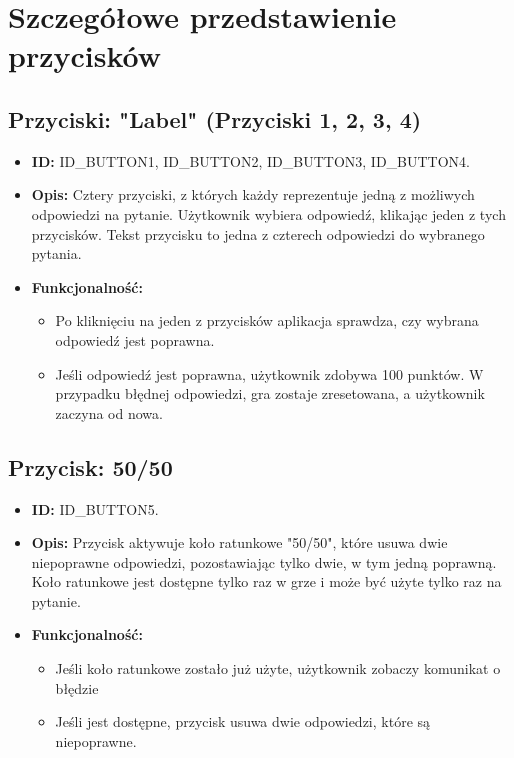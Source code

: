 \documentclass[]{article}
\begin{document}
	\section{Szczegółowe przedstawienie przycisków}
	
	\subsection{Przyciski: "Label" (Przyciski 1, 2, 3, 4)}
	\begin{itemize}
		\item \textbf{ID:} ID\_BUTTON1, ID\_BUTTON2, ID\_BUTTON3, ID\_BUTTON4.
		\item \textbf{Opis:} Cztery przyciski, z których każdy reprezentuje jedną z możliwych odpowiedzi na pytanie. Użytkownik wybiera odpowiedź, klikając jeden z tych przycisków. Tekst przycisku to jedna z czterech odpowiedzi do wybranego pytania.
		\item \textbf{Funkcjonalność:} 
		\begin{itemize}
			\item Po kliknięciu na jeden z przycisków aplikacja sprawdza, czy wybrana odpowiedź jest poprawna.
			\item Jeśli odpowiedź jest poprawna, użytkownik zdobywa 100 punktów. W przypadku błędnej odpowiedzi, gra zostaje zresetowana, a użytkownik zaczyna od nowa.
		\end{itemize}
	\end{itemize}
	
	\subsection{Przycisk: 50/50}
	\begin{itemize}
		\item \textbf{ID:} ID\_BUTTON5.
		\item \textbf{Opis:} Przycisk aktywuje koło ratunkowe "50/50", które usuwa dwie niepoprawne odpowiedzi, pozostawiając tylko dwie, w tym jedną poprawną. Koło ratunkowe jest dostępne tylko raz w grze i może być użyte tylko raz na pytanie.
		\item \textbf{Funkcjonalność:}
		\begin{itemize}
			\item Jeśli koło ratunkowe zostało już użyte, użytkownik zobaczy komunikat o błędzie
			\item Jeśli jest dostępne, przycisk usuwa dwie odpowiedzi, które są niepoprawne.
		\end{itemize}
	\end{itemize}
	
\end{document}
